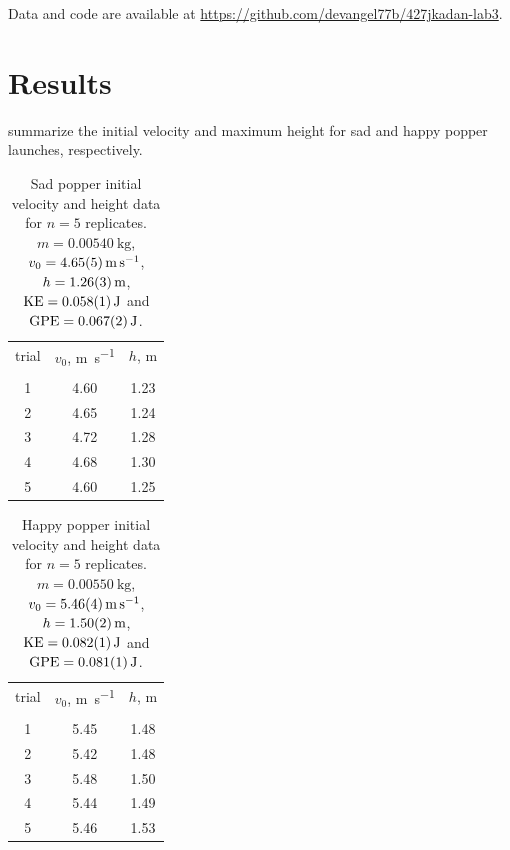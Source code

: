 \documentclass[reprint,amsmath,amssymb,aps,twoside]{revtex4-2} %
\begin{document}
Data and code are available at \url{https://github.com/devangel77b/427jkadan-lab3}.    





    
\section{Results}
 summarize the initial velocity and maximum height for sad and happy popper launches, respectively. 
\begin{table}
\caption{Sad popper initial velocity and height data for $n=5$ replicates. $m=\qty{0.00540}{\kilo\gram}$, $v_0=\qty{4.65\pm0.05}{\meter\per\second}$, $h=\qty{1.26\pm0.03}{\meter}$, $\text{KE}=\qty{0.058\pm0.001}{\joule}$ and $\text{GPE}=\qty{0.067\pm0.002}{\joule}$. }
\label{tab:3}
\begin{center}
\begin{ruledtabular}
\begin{tabular}{SSS}
{trial} & {$v_0$, \unit{\meter\per\second}} & {$h$, \unit{\meter}} \\
\colrule\\
1 & 4.60 & 1.23 \\
2 & 4.65 & 1.24 \\
3 & 4.72 & 1.28 \\
4 & 4.68 & 1.30 \\
5 & 4.60 & 1.25 \\
\end{tabular}
\end{ruledtabular}
\end{center}
\end{table}

\begin{table}
\caption{Happy popper initial velocity and height data for $n=5$ replicates. $m=\qty{0.00550}{\kilo\gram}$, $v_0=\qty{5.46\pm0.04}{\meter\per\second}$, $h=\qty{1.50\pm0.02}{\meter}$, $\text{KE}=\qty{0.082\pm0.001}{\joule}$ and $\text{GPE}=\qty{0.081\pm0.001}{\joule}$. }
\label{tab:4}
\begin{center}
\begin{ruledtabular}
\begin{tabular}{SSS}
{trial} & {$v_0$, \unit{\meter\per\second}} & {$h$, \unit{\meter}} \\
\colrule\\
1 & 5.45 & 1.48 \\
2 & 5.42 & 1.48 \\
3 & 5.48 & 1.50 \\
4 & 5.44 & 1.49 \\
5 & 5.46 & 1.53 \\
\end{tabular}
\end{ruledtabular}
\end{center}
\end{table}
\end{document}
